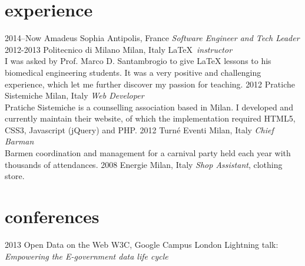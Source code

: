 \documentclass[]{friggeri-cv} %
\begin{document}

\section{experience}

\begin{entrylist}
\entry
{2014--Now}
{Amadeus}
{Sophia Antipolis, France}
{\emph{Software Engineer and Tech Leader} \\
}
\entry
{2012-2013}
{Politecnico di Milano}
{Milan, Italy}
{\LaTeX~\emph{instructor} \\
I was asked by Prof. Marco D. Santambrogio to give \LaTeX{} lessons to his biomedical engineering students.
It was a very positive and challenging experience, which let me further discover my passion for teaching.
}
\entry
{2012}
{Pratiche Sistemiche}
{Milan, Italy}
{\emph{Web Developer} \\
Pratiche Sistemiche is a counselling association based in Milan. I developed and currently
  maintain their website, of which the implementation required HTML5, CSS3, Javascript (jQuery)
  and PHP.
}
\entry
{2012}
{Turné Eventi}
{Milan, Italy}
{\emph{Chief Barman} \\
Barmen coordination and management for a carnival party held each year with thousands of attendances.
}
\entry
{2008}
{Energie}
{Milan, Italy}
{\emph{Shop Assistant}, clothing store.}
\end{entrylist}


\section{conferences}

\begin{entrylist}
\entry
{2013}
{Open Data on the Web}
{W3C, Google Campus London}
{Lightning talk: \emph{Empowering the E-government data life cycle}}
\end{entrylist}
\end{document}
